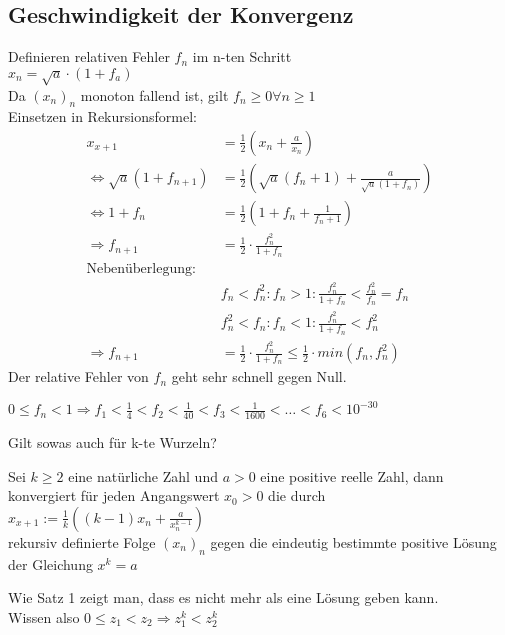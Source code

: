 \documentclass[12pt,a4paper,titlepage,draft]{article}
\begin{document}
\begin{bsp}
		\subsection{Geschwindigkeit der Konvergenz}
		Definieren relativen Fehler \(f_n\) im n-ten Schritt\\
		\(x_n = \sqrt{a} \cdot (1+f_a)\)\\
		Da \((x_n)_n\) monoton fallend ist, gilt \(f_n \geq 0 \forall n \geq 1\)\\
		Einsetzen in Rekursionsformel:\\
		\begin{align*}
			x_{x+1} &= \frac{1}{2}\left(x_n + \frac{a}{x_n}\right)\\
			\Leftrightarrow \sqrt{a}(1+f_{n+1}) &= \frac{1}{2}\left(\sqrt{a}(f_n+1) + \frac{a}{\sqrt{a}(1+f_n)} \right)\\
			\Leftrightarrow 1 + f_n &= \frac{1}{2}\left(1+f_n+\frac{1}{f_n + 1}\right)\\
			\Rightarrow f_{n+1} &= \frac{1}{2} \cdot \frac{f_n^2}{1 + f_n}\\
			\text{Nebenüberlegung:}\\
			&f_n < f_n^2: f_n > 1: \frac{f_n^2}{1+f_n} < \frac{f_n^2}{f_n} = f_n\\
			&f_n^2 < f_n: f_n < 1: \frac{f_n^2}{1+f_n} < f_n^2 \\
			\Rightarrow f_{n+1} &= \frac{1}{2} \cdot \frac{f_n^2}{1+f_n} \leq \frac{1}{2} \cdot min(f_n, f_n^2)
		\end{align*}
		Der relative Fehler von \(f_n\) geht sehr schnell gegen Null.
		\begin{bsp}
			\(0\leq f_n < 1 \Rightarrow f_1 < \frac{1}{4} < f_2 < \frac{1}{40} < f_3 < \frac{1}{1600} < \ldots < f_6 < 10^{-30}\)
		\end{bsp}
		Gilt sowas auch für k-te Wurzeln?
		\begin{satz}
			Sei \(k \geq 2 \) eine natürliche Zahl und \(a > 0\) eine positive reelle Zahl, dann konvergiert für jeden Angangswert \(x_0 > 0\) die durch\\
			\(x_{x+1} := \frac{1}{k} \left((k-1)x_n + \frac{a}{x_n^{k-1}}\right)\)\\
			rekursiv definierte Folge \((x_n)_n\) gegen die eindeutig bestimmte positive Lösung der Gleichung \(x^k = a\)
		\end{satz}
		\begin{bew}
			Wie Satz 1 zeigt man, dass es nicht mehr als eine Lösung geben kann.\\Wissen also \(0 \leq z_1 < z_2 \Rightarrow z_1^k < z_2^k\)\\

\end{bew}
\end{bsp}
\end{document}
